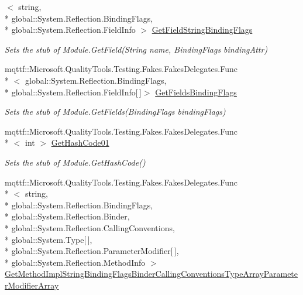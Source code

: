\begin{DoxyCompactItemize}
$<$ string, \\*
global\-::\-System.\-Reflection.\-Binding\-Flags, \\*
global\-::\-System.\-Reflection.\-Field\-Info $>$ \hyperlink{class_system_1_1_reflection_1_1_fakes_1_1_stub_module_ae75c1ac7aac137ae5200c21c63ff555d}{Get\-Field\-String\-Binding\-Flags}
\begin{DoxyCompactList}\small\item\em Sets the stub of Module.\-Get\-Field(\-String name, Binding\-Flags binding\-Attr)\end{DoxyCompactList}\item 
mqttf\-::\-Microsoft.\-Quality\-Tools.\-Testing.\-Fakes.\-Fakes\-Delegates.\-Func\\*
$<$ global\-::\-System.\-Reflection.\-Binding\-Flags, \\*
global\-::\-System.\-Reflection.\-Field\-Info\mbox{[}$\,$\mbox{]}$>$ \hyperlink{class_system_1_1_reflection_1_1_fakes_1_1_stub_module_a33330626abe346e8ef46353733cf7f46}{Get\-Fields\-Binding\-Flags}
\begin{DoxyCompactList}\small\item\em Sets the stub of Module.\-Get\-Fields(\-Binding\-Flags binding\-Flags)\end{DoxyCompactList}\item 
mqttf\-::\-Microsoft.\-Quality\-Tools.\-Testing.\-Fakes.\-Fakes\-Delegates.\-Func\\*
$<$ int $>$ \hyperlink{class_system_1_1_reflection_1_1_fakes_1_1_stub_module_a04eb72c2b6cc7c1ae277acd2bf446a38}{Get\-Hash\-Code01}
\begin{DoxyCompactList}\small\item\em Sets the stub of Module.\-Get\-Hash\-Code()\end{DoxyCompactList}\item 
mqttf\-::\-Microsoft.\-Quality\-Tools.\-Testing.\-Fakes.\-Fakes\-Delegates.\-Func\\*
$<$ string, \\*
global\-::\-System.\-Reflection.\-Binding\-Flags, \\*
global\-::\-System.\-Reflection.\-Binder, \\*
global\-::\-System.\-Reflection.\-Calling\-Conventions, \\*
global\-::\-System.\-Type\mbox{[}$\,$\mbox{]}, \\*
global\-::\-System.\-Reflection.\-Parameter\-Modifier\mbox{[}$\,$\mbox{]}, \\*
global\-::\-System.\-Reflection.\-Method\-Info $>$ \hyperlink{class_system_1_1_reflection_1_1_fakes_1_1_stub_module_af51a0d10e50a55b61d59bec4088057c3}{Get\-Method\-Impl\-String\-Binding\-Flags\-Binder\-Calling\-Conventions\-Type\-Array\-Parameter\-Modifier\-Array}

\end{DoxyCompactItemize}

